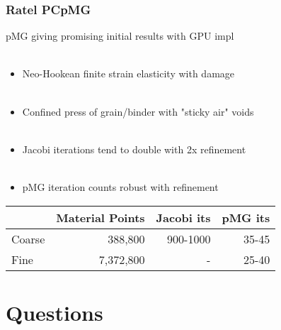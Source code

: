 \documentclass{beamer}
\begin{document}
\begin{frame}
\begin{center}
\frametitle{Ratel PCpMG}

pMG giving promising initial results with GPU impl\\

~\\

\begin{itemize}

\item Neo-Hookean finite strain elasticity with damage\\

~\\

\item Confined press of grain/binder with "sticky air" voids\\

~\\

\item Jacobi iterations tend to double with 2x refinement\\

~\\

\item pMG iteration counts robust with refinement\\

\end{itemize}

\begin{table}[ht!]
\begin{center}
\begin{tabular}{l r r r}
  \toprule
             & Material Points & Jacobi its & pMG its  \\
  \toprule
  Coarse     &         388,800 &   900-1000 &   35-45  \\
  Fine       &       7,372,800 &      -     &   25-40  \\
  \bottomrule
\end{tabular}
\end{center}
\end{table}

\end{center}
\end{frame}

\section{Questions}
\end{document}
